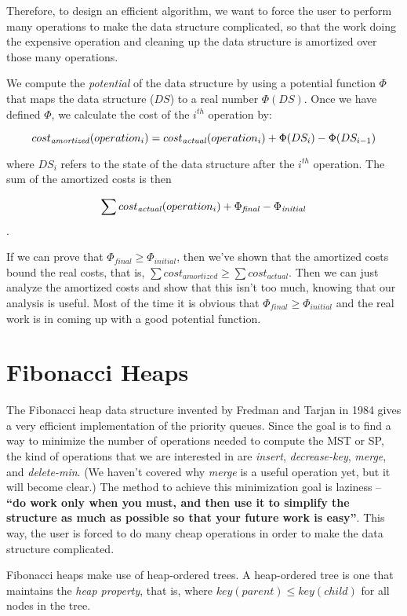 \documentclass{article}
\begin{document}
Therefore, to design an efficient algorithm, we
want to force the user to perform many operations to make the
data structure complicated, so that the work doing the expensive
operation and cleaning up the
data structure is amortized over those many operations.

We compute the \emph{potential} of
the data structure  by using a potential function $\Phi$
that maps the data structure ($DS$) to a real number $\Phi(DS)$.  Once
we have defined $\Phi$, we calculate the cost of the $i^{th}$ operation by:

$$cost_{\it amortized}(operation_i) = cost_{\it actual}(operation_i) +
\Phi(DS_{i}) - \Phi(DS_{i-1})$$

where $DS_{i}$ refers to the state of the data structure after the
$i^{th}$ operation. The sum of the amortized costs is then

$$\sum cost_{\it actual}(operation_i) + \Phi_{\it final} - \Phi_{\it initial}$$.

If we can prove that $\Phi_{final} \geq \Phi_{initial}$, then we've
shown that the amortized costs bound the real costs, that is,
$\sum{cost_{amortized}} \geq \sum{cost_{actual}}$. Then we can just analyze
the amortized costs and show that this isn't too much, knowing that our
analysis is useful. Most of the time it is obvious that
$\Phi_{final} \geq \Phi_{initial}$ and the real work is in coming up with a
good potential function.

\section{Fibonacci Heaps}

The Fibonacci heap data structure invented by Fredman and Tarjan in 1984
gives a
very efficient implementation of the priority queues. Since the goal is
to find a way to minimize the number of operations needed to compute the
MST or SP, the kind of operations that we are interested in are
\emph{insert}, \emph{decrease-key}, \emph{merge}, and
\emph{delete-min}. (We haven't covered why \emph{merge} is a useful operation
yet, but it will become clear.) The method to achieve this minimization
goal is laziness -- \textbf{``do work
only when you must, and then use it to simplify the structure as much as
possible so that your future work is easy''}. This way, the user is
forced to do many cheap operations in order to make the data structure
complicated.

Fibonacci heaps make use of heap-ordered trees. A heap-ordered tree is
one that maintains the \emph{heap property}, that is, where
$key(parent) \leq key(child)$ for all nodes in the tree.
\end{document}
